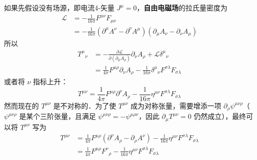 如果先假设没有场源，即电流4-矢量 $J^\mu = 0$，\textbf{自由电磁场}的拉氏量密度为
\begin{equation}
\begin{aligned}
\mathcal{L}&=-\frac{1}{16\pi}F^{\mu\nu} F_{\mu\nu}\\
&=-\frac{1}{16\pi}(\partial^\mu A^\nu-\partial^\nu A^\mu)(\partial_\mu A_\nu-\partial_\nu A_\mu)
\end{aligned}
\end{equation}
所以
\begin{equation}
\begin{aligned}
T^\mu{}_\nu&=-\frac{\partial \mathcal{L}}{\partial (\partial_\mu A_\rho)}\partial_\nu A_\rho+\mathcal{L}\delta^\mu{}_\nu\\
&=\frac{1}{4\pi}F^{\mu\rho}\partial_\nu A_\rho-\frac{1}{16\pi}\delta^\mu{}_\nu F^{\sigma\lambda}F_{\sigma\lambda}
\end{aligned}
\end{equation}
或者将 $\nu$ 指标上升：
\begin{equation}
T^{\mu\nu}=\frac{1}{4\pi}F^{\mu\rho}\partial^\nu A_\rho - \frac{1}{16\pi} \eta^{\mu\nu}F^{\sigma\lambda}F_{\sigma\lambda}
\end{equation}
然而现在的 $T^{\mu\nu}$ 是不对称的．为了使 $T^{\mu\nu}$ 成为对称张量，需要增添一项 $\partial_\rho \psi^{\mu\nu\rho}$（$\psi^{\mu\nu\rho}$ 是某个三阶张量，且满足 $\psi^{\mu\nu\rho}=-\psi^{\mu\rho\nu}$，因此 $\partial_\mu T^{\mu\nu}=0$ 仍然成立），最终可以将 $T^{\mu\nu}$ 写为
\begin{equation}
\begin{aligned}
T^{\mu\nu}&=\frac{1}{4\pi}F^{\mu\rho}(\partial^\nu A_\rho-\partial_\rho A^\nu) - \frac{1}{16\pi} \eta^{\mu\nu}F^{\sigma\lambda}F_{\sigma\lambda}\\
&=\frac{1}{4\pi}F^{\mu\rho}F^\nu{}_\rho - \frac{1}{16\pi} \eta^{\mu\nu}F^{\sigma\lambda}F_{\sigma\lambda}
\end{aligned}
\end{equation}

